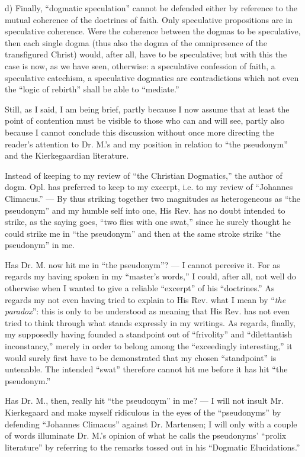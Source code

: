 \documentclass[12pt,a4paper,openany]{book}
\newcommand{\opage}[1]{\marginnote{\footnotesize\textit{[#1]}}}
\begin{document}
d) Finally, ``dogmatic speculation'' cannot be defended
either by reference to the mutual coherence of the doctrines
of faith. Only speculative propositions are in
speculative coherence. Were the coherence between
the dogmas to be speculative, then each single dogma
(thus also the dogma of the omnipresence of the transfigured Christ)
would, after all, have to be speculative; but with this the case
is now, as we have seen, otherwise: a speculative confession of faith,
a speculative catechism, a speculative dogmatics are
contradictions which not even the ``logic of rebirth'' shall be able
to ``mediate.''

Still, as I said, I am being brief, partly because I now
assume that at least the point of contention must be visible to
those who can and will see, partly also because I cannot
conclude this discussion without once more directing
the reader's attention to Dr. M.'s and my position in relation to
``the pseudonym'' and the Kierkegaardian literature.

Instead of keeping to my review of ``the Christian
Dogmatics,'' the author of dogm. Opl. has preferred
to keep to my excerpt, i.e. to my review of
\setcounter{footnote}{0}%
\opage{67}``Johannes Climacus.'' --- By thus striking together two magnitudes
as heterogeneous as ``the pseudonym'' and my humble self
into one, His Rev. has no doubt intended to strike,
as the saying goes, ``two flies with one swat,'' since he
surely thought he could strike me in ``the pseudonym'' and
then at the same stroke strike ``the pseudonym'' in me.

Has Dr. M. now hit me in ``the pseudonym''? --- I
cannot perceive it. For as regards my having
spoken in my ``master's words,'' I could, after all, not well do
otherwise when I wanted to give a reliable ``excerpt'' of his
``doctrines.'' As regards my not even having
tried to explain to His Rev. what I mean by ``\emph{the paradox}'':
this is only to be understood as meaning that His Rev.
has not even tried to think through what stands expressly
in my writings. As regards, finally, my supposedly
having founded a standpoint out of ``frivolity'' and ``dilettantish inconstancy,''
merely in order to belong among the ``exceedingly
interesting,'' it would surely first have to be demonstrated that my
chosen ``standpoint'' is untenable. The intended ``swat''
therefore cannot hit me before it has hit ``the pseudonym.''


Has Dr. M., then, really hit ``the pseudonym'' in me?
--- I will not insult Mr. Kierkegaard and make myself
ridiculous in the eyes of the ``pseudonyms'' by defending ``Johannes
Climacus'' against Dr. Martensen; I will only with a couple of words
illuminate Dr. M.'s opinion of what he calls the pseudonyms'
``prolix literature'' by referring to the remarks tossed out
in his ``Dogmatic Elucidations.''
\end{document}
